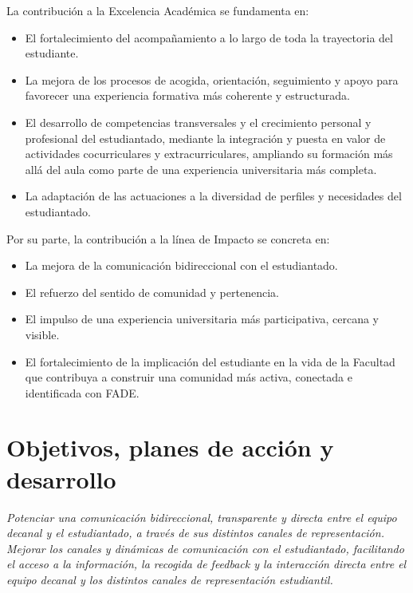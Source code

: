 \documentclass[11pt,a4paper]{scrreprt}
\begin{document}
La contribución a la Excelencia Académica se fundamenta en:
\begin{itemize}[noitemsep,topsep=2pt]
\item El fortalecimiento del acompañamiento a lo largo de toda la trayectoria del estudiante.
\item La mejora de los procesos de acogida, orientación, seguimiento y apoyo para favorecer una experiencia formativa más coherente y estructurada.
\item El desarrollo de competencias transversales y el crecimiento personal y profesional del estudiantado, mediante la integración y puesta en valor de actividades cocurriculares y extracurriculares, ampliando su formación más allá del aula como parte de una experiencia universitaria más completa.
\item La adaptación de las actuaciones a la diversidad de perfiles y necesidades del estudiantado.
\end{itemize}

Por su parte, la contribución a la línea de Impacto se concreta en:
\begin{itemize}[noitemsep,topsep=2pt]
\item La mejora de la comunicación bidireccional con el estudiantado.
\item El refuerzo del sentido de comunidad y pertenencia.
\item El impulso de una experiencia universitaria más participativa, cercana y visible.
\item El fortalecimiento de la implicación del estudiante en la vida de la Facultad que contribuya a construir una comunidad más activa, conectada e identificada con FADE.
\end{itemize}

\section{Objetivos, planes de acción y desarrollo}
\newpage
{}
{\small\color{mutedcolor}\itshape Potenciar una comunicación bidireccional, transparente y directa entre el equipo decanal y el estudiantado, a través de sus distintos canales de representación. Mejorar los canales y dinámicas de comunicación con el estudiantado, facilitando el acceso a la información, la recogida de feedback y la interacción directa entre el equipo decanal y los distintos canales de representación estudiantil. }\par\vspace{6pt}
\end{document}

